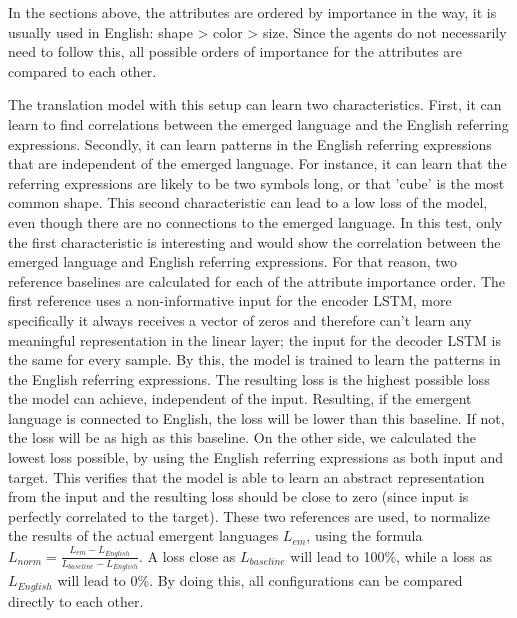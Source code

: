 In the sections above, the attributes are ordered by importance in the way, it is usually used in English: shape > color > size.
Since the agents do not necessarily need to follow this, all possible orders of importance for the attributes are compared to each other.

The translation model with this setup can learn two characteristics.
First, it can learn to find correlations between the emerged language and the English referring expressions.
Secondly, it can learn patterns in the English referring expressions that are independent of the emerged language.
For instance, it can learn that the referring expressions are likely to be two symbols long, or that 'cube' is the most common shape.
This second characteristic can lead to a low loss of the model, even though there are no connections to the emerged language.
In this test, only the first characteristic is interesting and would show the correlation between the emerged language and English referring expressions.
For that reason, two reference baselines are calculated for each of the attribute importance order.
The first reference uses a non-informative input for the encoder LSTM, more specifically it always receives a vector of zeros and therefore can't learn any meaningful representation in the linear layer; the input for the decoder LSTM is the same for every sample.
By this, the model is trained to learn the patterns in the English referring expressions.
The resulting loss is the highest possible loss the model can achieve, independent of the input.
Resulting, if the emergent language is connected to English, the loss will be lower than this baseline.
If not, the loss will be as high as this baseline.
On the other side, we calculated the lowest loss possible, by using the English referring expressions as both input and target.
This verifies that the model is able to learn an abstract representation from the input and the resulting loss should be close to zero (since input is perfectly correlated to the target).
These two references are used, to normalize the results of the actual emergent languages $L_{em}$, using the formula $L_{norm} = \frac{L_{em}-L_{English}}{L_{baseline} - L_{English}}$.
A loss close as $L_{baseline}$ will lead to 100\%, while a loss as $L_{English}$ will lead to 0\%.
By doing this, all configurations can be compared directly to each other.

